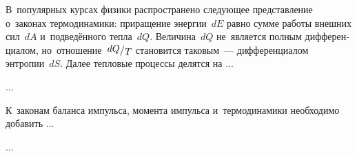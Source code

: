 

\begin{otherlanguage}{russian}

В~популярных курсах физики распространено следующее представление о~законах термодинамики: приращение энергии~$dE$ равно сумме работы внешних сил~$dA$ и~подведённого тепла~$dQ$. Величина~$dQ$ не~является полным дифференциалом, но~отношение~${\raisemath{.16em}{dQ}/\hspace{.1ex}\raisemath{-0.16em}{T}}$ становится таковым~--- дифференциалом энтропии~$dS$. Далее тепловые процессы делятся на ...

...



\end{otherlanguage}



\begin{otherlanguage}{russian}

К~законам баланса импульса, момента импульса и~термодинамики необходимо добавить ...

...



\end{otherlanguage}



